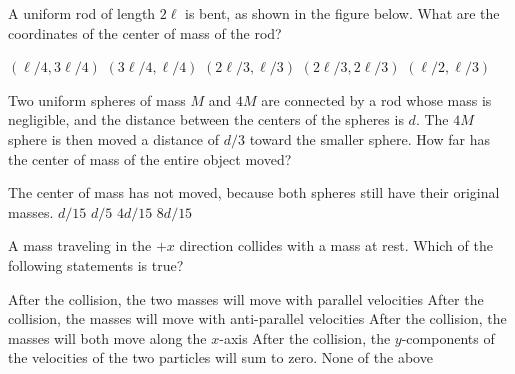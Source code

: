 \documentclass{../../oss-apphys-exam}
\begin{document}
\genheader



\raggedcolumns
\begin{multicols*}{2}
  \begin{questions}
    \question A uniform rod of length $2\ell$ is bent, as shown in the figure
    below. What are the coordinates of the center of mass of the rod?
    \begin{center}
    \end{center}
    \begin{choices}
      \choice $(\ell/4,3\ell/4)$
      \correctchoice $(3\ell/4,\ell/4)$
      \choice $(2\ell/3,\ell/3)$
      \choice $(2\ell/3,2\ell/3)$
      \choice $(\ell/2,\ell/3)$
    \end{choices}

    \question Two uniform spheres of mass $M$ and $4M$ are connected by a rod
    whose mass is negligible, and the distance between the centers of the
    spheres is $d$. The $4M$ sphere is then moved a distance of $d/3$ toward the
    smaller sphere. How far has the center of mass of the entire object moved?
    \begin{choices}
      \choice The center of mass has not moved, because both spheres still have
      their original masses.
      \choice $d/15$
      \choice $d/5$
      \correctchoice $4d/15$
      \choice $8d/15$
    \end{choices}

    \question A mass traveling in the $+x$ direction collides with a mass at
    rest. Which of the following statements is true?
    \begin{choices}
      \choice After the collision, the two masses will move with parallel
      velocities
      \choice After the collision, the masses will move with anti-parallel
      velocities
      \choice After the collision, the masses will both move along the $x$-axis
      \choice After the collision, the $y$-components of the velocities of the
      two particles will sum to zero.
      \choice None of the above
    \end{choices}
    \columnbreak
    

\end{questions}
\end{multicols*}
\end{document}

